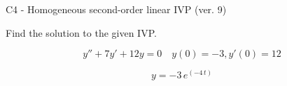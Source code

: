 \begin{exercise}
  \begin{exerciseTitle}C4 - Homogeneous second-order linear IVP (ver. 9)\end{exerciseTitle}
  \begin{exerciseStatement}
    
Find the solution to the given IVP.

    
\[y''+7y'+12y = 0 \hspace{1em} y(0) = -3 , y'(0) = 12\]

  \end{exerciseStatement}
  \begin{exerciseAnswer}
    
\[y= -3 \, e^{\left(-4 \, t\right)}\]

  \end{exerciseAnswer}
\end{exercise}